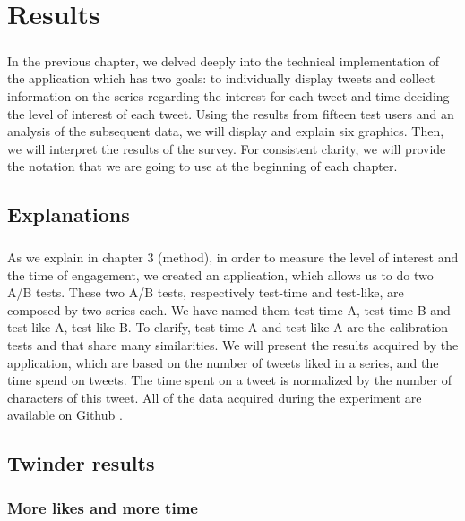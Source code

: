 \chapter{Results}

\paragraph{}
In the previous chapter, we delved deeply into the technical implementation of the application which has two goals: to individually display tweets and collect information on the series regarding the interest for each tweet and time deciding the level of interest of each tweet. Using the results from fifteen test users and an analysis of the subsequent data, we will display and explain six graphics. Then, we will interpret the results of the survey. For consistent clarity, we will provide the notation that we are going to use at the beginning of each chapter.

\section{Explanations}

\paragraph{}
As we explain in chapter 3 (method), in order to measure the level of interest and the time of engagement, we created an application, which allows us to do two A/B tests. These two A/B tests, respectively test-time and test-like, are composed by two series each. We have named them test-time-A, test-time-B and test-like-A, test-like-B. To clarify, test-time-A and test-like-A are the calibration tests and that share many similarities. We will present the results acquired by the application, which are based on the number of tweets liked in a series, and the time spend on tweets. The time spent on a tweet is normalized by the number of characters of this tweet. All of the data acquired during the experiment are available on Github \cite{tw_github}.

\section{Twinder results}

\subsection{More likes and more time}

